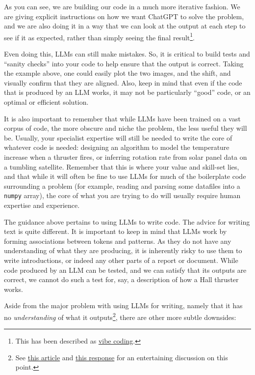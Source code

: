 \documentclass{tufte-book}
\begin{document}
As you can see, we are building our code in a much more iterative fashion. We are giving explicit instructions on how we want ChatGPT to solve the problem, and we are also doing it in a way that we can look at the output at each step to see if it as expected, rather than simply 
seeing the final result\footnote{\raggedright{This has been described as \href{arstechnica.com/ai/2025/03/is-vibe-coding-with-ai-gnarly-or-reckless-maybe-some-of-both/}{vibe coding}.}}.

Even doing this, LLMs can still make mistakes. So, it is critical to build tests and ``sanity checks'' into your code to help ensure that the output is correct. Taking the example above, one could easily plot the two images, and the shift, and visually confirm that they are aligned. Also, keep in mind that even if the code that is produced by an LLM works, it may not be particularly ``good'' code, or an optimal or efficient solution.

It is also important to remember that while LLMs have been trained on a vast corpus of code, the more obscure and niche the problem, the less useful they will be. Usually, your specialist expertise will still be needed to write the core of whatever code is needed: designing an algorithm to model the temperature increase when a thruster fires, or inferring rotation rate from solar panel data on a tumbling satellite. Remember that this is where your value and skill-set lies, and that while it will often be fine to use LLMs for much of the boilerplate code surrounding a problem (for example, reading and parsing some datafiles into a \verb|numpy| array), the core of what you are trying to do will usually require human expertise and experience. 

The guidance above pertains to using LLMs to write code. The advice for writing text is quite different. It is important to keep in mind that LLMs work by forming associations between tokens and patterns. As they do not have any understanding of what they are producing, it is inherently risky to use them to write introductions, or indeed any other parts of a report or document. While code produced by an LLM can be tested, and we can satisfy that its outputs are correct, we cannot do such a test for, say, a description of how a Hall thruster works.

Aside from the major problem with using LLMs for writing, namely that it has no {\it understanding} of what it outputs\footnote{See \href{https://link.springer.com/article/10.1007/s10676-024-09775-5}{this article} and \href{https://link.springer.com/article/10.1007/s10676-025-09828-3}{this response} for an entertaining discussion on this point.}, there are other more subtle downsides:
\end{document}
